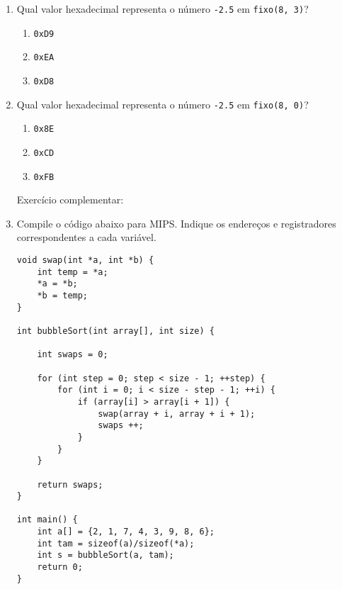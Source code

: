 \documentclass{article}
\begin{document}
\begin{enumerate}
\bigskip

\item \large Qual valor hexadecimal representa o número \verb|-2.5| em \verb|fixo(8, 3)|?

\smallskip

\begin{enumerate}
\item \verb|0xD9|
\item \verb|0xEA|
\item \verb|0xD8|%
\end{enumerate}

\bigskip

\item \large Qual valor hexadecimal representa o número \verb|-2.5| em \verb|fixo(8, 0)|?

\smallskip

\begin{enumerate}
\item \verb|0x8E|
\item \verb|0xCD|
\item \verb|0xFB|%
\end{enumerate}

\bigskip

Exercício complementar:

\item \large Compile o código abaixo para MIPS. Indique os endereços e registradores correspondentes a cada variável.

\begin{lstlisting}[frame=single]
void swap(int *a, int *b) {
    int temp = *a;
    *a = *b;
    *b = temp;
}

int bubbleSort(int array[], int size) {

    int swaps = 0;

    for (int step = 0; step < size - 1; ++step) {
        for (int i = 0; i < size - step - 1; ++i) {
            if (array[i] > array[i + 1]) {
                swap(array + i, array + i + 1);
                swaps ++;
            }
        }
    }

    return swaps;
}

int main() {
    int a[] = {2, 1, 7, 4, 3, 9, 8, 6};
    int tam = sizeof(a)/sizeof(*a);
    int s = bubbleSort(a, tam);
    return 0;
}

\end{lstlisting}

\end{enumerate}
\end{document}

